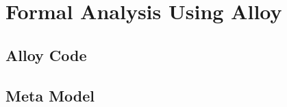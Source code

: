 \section{Formal Analysis Using Alloy}



\def\alloy{\lstinline[
	language=alloy,
	style=alloy,
	basicstyle=\ttfamily\small
]}

\renewcommand{\ttdefault}{pcr}  %
\lstset{
	basicstyle=\ttfamily\large
}

\subsection{Alloy Code}

\clearpage

\subsection{Meta Model}

